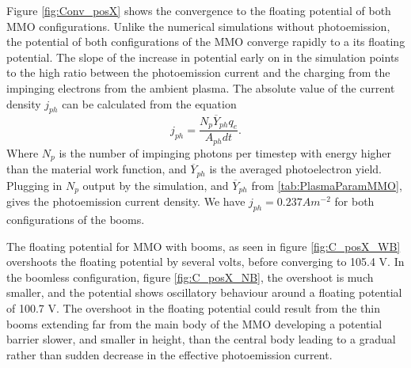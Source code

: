 Figure \ref{fig:Conv_posX} shows the convergence to the floating potential of both MMO configurations. Unlike the numerical simulations without photoemission, the potential of both configurations of the MMO converge rapidly to a its floating potential. The slope of the increase in potential early on in the simulation points to the high ratio between the photoemission current and the charging from the impinging electrons from the ambient plasma. The absolute value of the current density $j_{ph}$ can be calculated from the equation
\begin{equation}
     j_{ph} = \frac{N_p \overline{Y}_{ph} q_e}{A_{ph} dt}. 
\end{equation}
Where $N_p$ is the number of impinging photons per timestep with energy higher than the material work function, and $\overline{Y}_{ph}$ is the averaged photoelectron yield. Plugging in $N_p$ output by the simulation, and $\overline{Y}_{ph}$ from \cref{tab:PlasmaParamMMO}, gives the photoemission current density. We have $j_{ph} = 0.237 A m^{-2}$ for both configurations of the booms.


The floating potential for MMO with booms, as seen in figure \ref{fig:C_posX_WB} overshoots the floating potential by several volts, before converging to 105.4 V. In the boomless configuration, figure \ref{fig:C_posX_NB}, the overshoot is much smaller, and the potential shows oscillatory behaviour around a floating potential of 100.7 V. The overshoot in the floating potential could result from the thin booms extending far from the main body of the MMO developing a potential barrier slower, and smaller in height, than the central body leading to a gradual rather than sudden decrease in the effective photoemission current.

